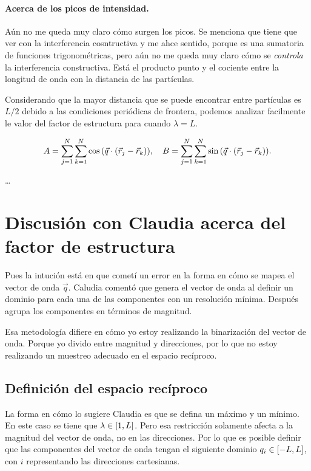 \documentclass[../main.tex]{subfiles}
\begin{document}

\paragraph{Acerca de los picos de intensidad.}
Aún no me queda muy claro cómo surgen los picos.
Se menciona que tiene que ver con la interferencia cosntructiva y me ahce sentido, porque es una sumatoria de funciones trigonométricas, pero aún no me queda muy claro cómo se \emph{controla} la interferencia constructiva.
Está el producto punto y el cociente entre la longitud de onda con la distancia de las partículas.


Considerando que la mayor distancia que se puede encontrar entre partículas es \(L/2\) debido a las condiciones periódicas de frontera, podemos analizar facilmente le valor del factor de estructura para cuando \(\lambda=L\).

\begin{gather*}
    A = \sum_{j=1}^{N}\sum_{k=1}^{N}\cos\qty(\vec{q}\cdot\qty(\vec{r}_{j}-\vec{r}_{k})),\quad
    B = \sum_{j=1}^{N}\sum_{k=1}^{N}\sin\qty(\vec{q}\cdot\qty(\vec{r}_{j}-\vec{r}_{k})).
\end{gather*}

\dots 

\section{Discusión con Claudia acerca del factor de estructura}

Pues la intución está en que cometí un error en la forma en cómo se mapea el vector de onda \(\vec{q}\).
Caludia comentó que genera el vector de onda al definir un dominio para cada una de las componentes con un resolución mínima. 
Después agrupa los componentes en términos de magnitud.

Esa metodología difiere en cómo yo estoy realizando la binarización del vector de onda.
Porque yo divido entre magnitud y direcciones, por lo que no estoy realizando un muestreo adecuado en el espacio recíproco.

\subsection{Definición del espacio recíproco}

La forma en cómo lo sugiere Claudia es que se defina un máximo y un mínimo.
En este caso se tiene que \(\lambda\in\qty[1,L]\).
Pero esa restricción solamente afecta a la magnitud del vector de onda, no en las direcciones.
Por lo que es posible definir que las componentes del vector de onda tengan el siguiente dominio \(q_{i}\in\qty[-L,L]\), con \(i\) representando las direcciones cartesianas.
\end{document}
